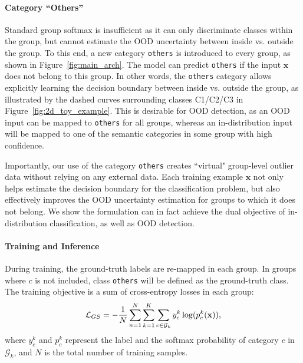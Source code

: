 \documentclass[final]{cvpr}
\def\*#1{\mathbf{#1}}
\begin{document}
\paragraph{Category ``Others''} Standard group softmax is insufficient as it can only discriminate classes within the group, but cannot estimate the OOD uncertainty between inside vs. outside the group. To this end, a new category \texttt{others} is introduced to every group, as shown in Figure~\ref{fig:main_arch}. The model can predict \texttt{others} if the input $\*x$ does not belong to this group. In other words, the \texttt{others} category allows explicitly learning the decision boundary between inside vs. outside the group, as illustrated by the dashed curves surrounding classes C1/C2/C3 in Figure~\ref{fig:2d_toy_example}. This is desirable for OOD detection, as an OOD input can be mapped to \texttt{others} for all groups, whereas an in-distribution input will be mapped to one of the semantic categories in some group with high confidence.


Importantly, our use of the category \texttt{others}  creates ``virtual" group-level outlier data without relying on any external data. Each training example $\*x$ not only helps estimate the decision boundary for the classification problem, but also effectively improves the OOD uncertainty estimation for groups to which it does not belong. We show the formulation can in fact achieve the dual objective of in-distribution classification, as well as OOD detection. 



\vspace{-0.3cm}
\paragraph{Training and Inference} During training, the ground-truth labels are re-mapped in each group. In groups where $c$ is not included, class \texttt{others} will be defined as the ground-truth class. 
The training objective is a sum of cross-entropy losses in each group:
\vspace{-0.2cm}
\begin{equation}
    \mathcal{L}_{GS} = - \frac{1}{N}\sum_{n=1}^N \sum_{k=1}^K \sum_{c\in \mathcal{G}_k}y_c^k\log (p_c^k (\mathbf{x})),
\vspace{-0.1cm}
\end{equation}
where $y_c^k$ and $p_c^k$ represent the label and the softmax probability of category $c$ in $\mathcal{G}_k$, and $N$ is the total number of training samples.
\end{document}
